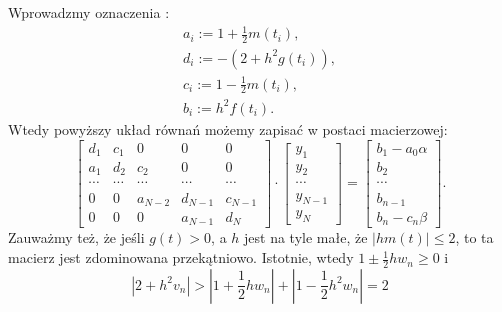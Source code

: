 Wprowadzmy oznaczenia :
\begin{align*}
a_i:= 1 + \frac{1}{2}m(t_i),\\
d_i:= -(2+h^2 g(t_i)), \\
c_i:= 1 - \frac{1}{2}m(t_i), \\
b_i:= h^2 f(t_i).
\end{align*}
Wtedy powyższy układ równań możemy zapisać w postaci macierzowej:
\begin{equation}\label{macierz}
\left[ \begin{array}{ccccc}
d_1 & c_1 & 0 & 0 & 0 \\
a_1 & d_2 & c_2 & 0 & 0\\
\cdots & \cdots & \cdots &\cdots  &\cdots \\
0 & 0 & a_{N-2} & d_{N-1} & c_{N-1}\\
0 & 0 & 0 & a_{N-1} & d_N 
\end{array} \right] \cdot
\left[ \begin{array}{c}
y_1 \\
y_2 \\
\cdots \\
y_{N-1} \\
y_{N}  
\end{array} \right] =
\left[ \begin{array}{c}
b_1 - a_0\alpha\\
b_2 \\
\cdots \\
b_{n-1} \\
b_n -c_n\beta 
\end{array} \right] .
\end{equation}
Zauważmy też, że jeśli $g(t)>0$, a $h$ jest na tyle małe, że $ |h m(t)| \leq 2$, to ta macierz jest zdominowana przekątniowo. Istotnie, wtedy $ 1 \pm \frac{1}{2}hw_n \geq 0 $ i
$$
|2 + h^2v_n| > |1 + \frac{1}{2}hw_n| + |1 - \frac{1}{2}h^2w_n| = 2
$$

